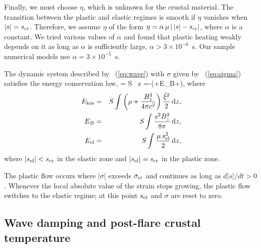 Finally, we must choose $\eta$, which is unknown for the crustal material.
The transition between the plastic and elastic regimes is smooth if $\eta$ vanishes when $|s|=s_{\rm cr}$. 
Therefore, we assume $\eta$ of the form $\eta=\alpha\,\mu\,|\,|s|-s_{\rm cr}|$, where $\alpha$ is a constant.
We tried various values of $\alpha$ and found that plastic heating weakly depends on it as long as $\alpha$ is sufficiently large, $\alpha>3\times 10^{-6}$~s. 
Our sample numerical models use $\alpha=3\times 10^{-5}$~s.

The dynamic system described by \Eq~(\ref{eq:wave}) with $\sigma$ given by \Eq~(\ref{eq:sigma}) satisfies the energy conservation law,
\beq
\label{eq:energy}
   = S \int {}\, \md z =-\left(\Ekin+E_B+\Eel\right),
\eeq
where
\begin{eqnarray}
  E_{\rm kin}   &=& S \int \left(\rho+\frac{B_z^2}{4\pi c^2}\right) \frac{\dot{\xi}^2}{2}\, \mathrm{d} z,\\
  E_B &=& S \int \frac{s^2 B_z^2}{8\pi}\, \mathrm{d} z, \\
  E_{\rm el}    &=& S \int \frac{\mu\,s_{\rm el}^2}{2}\, \mathrm{d} z,
\end{eqnarray}
where $|s_{\rm el}|<s_{\rm cr}$ in the elastic zone and $|s_{\rm el}|=s_{\rm cr}$ in the plastic zone.

The plastic flow occurs where $|\sigma|$ exceeds $\sigma_{\rm cr}$ and continues as long as $d|s|/dt>0$. 
Whenever the local absolute value of the strain stops growing, the plastic flow switches to the elastic regime; at this point $s_{\rm el}$ and $\sigma$ are reset to zero.

\subsection{Wave damping and post-flare crustal temperature}


